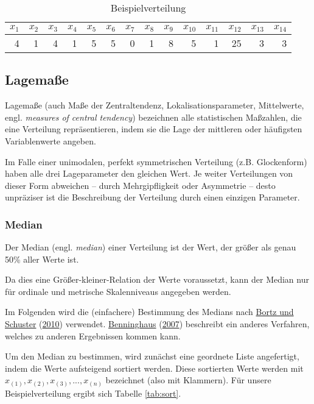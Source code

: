 \documentclass[
  ngerman,
]{article}
\begin{document}
\begin{table}[!h]

\caption{\label{tab:werte}Beispielverteilung}
\centering
\begin{tabular}[t]{rrrrrrrrrrrrrr}
\toprule
$x_{1}$ & $x_{2}$ & $x_{3}$ & $x_{4}$ & $x_{5}$ & $x_{6}$ & $x_{7}$ & $x_{8}$ & $x_{9}$ & $x_{10}$ & $x_{11}$ & $x_{12}$ & $x_{13}$ & $x_{14}$\\
\midrule
4 & 1 & 4 & 1 & 5 & 5 & 0 & 1 & 8 & 5 & 1 & 25 & 3 & 3\\
\bottomrule
\end{tabular}
\end{table}

\hypertarget{lagemauxdfe}{%
\subsection{Lagemaße}\label{lagemauxdfe}}

Lagemaße (auch Maße der Zentraltendenz, Lokalisationsparameter, Mittelwerte, engl. \emph{measures of central tendency}) bezeichnen alle statistischen Maßzahlen, die eine Verteilung repräsentieren, indem sie die Lage der mittleren oder häufigsten Variablenwerte angeben.

Im Falle einer unimodalen, perfekt symmetrischen Verteilung (z.B. Glockenform) haben alle drei Lageparameter den gleichen Wert. Je weiter Verteilungen von dieser Form abweichen -- durch Mehrgipfligkeit oder Asymmetrie -- desto unpräziser ist die Beschreibung der Verteilung durch einen einzigen Parameter.

\hypertarget{median}{%
\subsubsection{Median}\label{median}}

Der Median (engl. \emph{median}) einer Verteilung ist der Wert, der größer als genau 50\% aller Werte ist.

Da dies eine Größer-kleiner-Relation der Werte voraussetzt, kann der Median nur für ordinale und metrische Skalenniveaus angegeben werden.

Im Folgenden wird die (einfachere) Bestimmung des Medians nach \protect\hyperlink{ref-bortz}{Bortz und Schuster} (\protect\hyperlink{ref-bortz}{2010}) verwendet. \protect\hyperlink{ref-benninghaus}{Benninghaus} (\protect\hyperlink{ref-benninghaus}{2007}) beschreibt ein anderes Verfahren, welches zu anderen Ergebnissen kommen kann.

Um den Median zu bestimmen, wird zunächst eine geordnete Liste angefertigt, indem die Werte aufsteigend sortiert werden. Diese sortierten Werte werden mit \(x_{(1)}, x_{(2)}, x_{(3)}, ..., x_{(n)}\) bezeichnet (also mit Klammern). Für unsere Beispielverteilung ergibt sich Tabelle \ref{tab:sort}.
\end{document}
